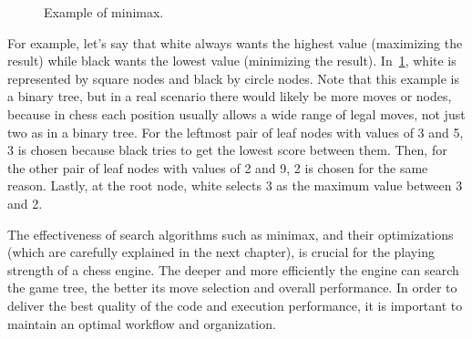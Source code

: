 \begin{figure}[H]
    \centering
    \caption{Example of minimax.}\label{fig:minimax}
\end{figure}

\noindent For example, let's say that white always wants the highest value (maximizing the result) while black wants the lowest value (minimizing the result). In~\cref{fig:minimax}, white is represented by square nodes and black by circle nodes. Note that this example is a binary tree, but in a real scenario there would likely be more moves or nodes, because in chess each position usually allows a wide range of legal moves, not just two as in a binary tree. For the leftmost pair of leaf nodes with values of 3 and 5, 3 is chosen because black tries to get the lowest score between them. Then, for the other pair of leaf nodes with values of 2 and 9, 2 is chosen for the same reason. Lastly, at the root node, white selects 3 as the maximum value between 3 and 2.

\vspace{1em}

\noindent The effectiveness of search algorithms such as minimax, and their optimizations (which are carefully explained in the next chapter), is crucial for the playing strength of a chess engine. The deeper and more efficiently the engine can search the game tree, the better its move selection and overall performance. In order to deliver the best quality of the code and execution performance, it is important to maintain an optimal workflow and organization.

